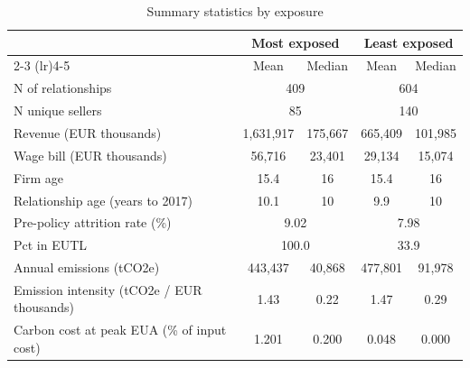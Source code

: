 \begin{table}[ht]
\centering
\caption{Summary statistics by exposure}
\label{tab:phase4_within_nace4d_descriptive_summary_table}
\begin{tabular}{lcccc}
\toprule
 & \multicolumn{2}{c}{Most exposed} & \multicolumn{2}{c}{Least exposed} \\
\cmidrule(lr){2-3} \cmidrule(lr){4-5}
 & Mean & Median & Mean & Median \\
\midrule
N of relationships & \multicolumn{2}{c}{409} & \multicolumn{2}{c}{604} \\
N unique sellers & \multicolumn{2}{c}{85} & \multicolumn{2}{c}{140} \\
\midrule
Revenue (EUR thousands) & 1,631,917 & 175,667 & 665,409 & 101,985 \\
Wage bill (EUR thousands) & 56,716 & 23,401 & 29,134 & 15,074 \\
Firm age & 15.4 & 16 & 15.4 & 16 \\
Relationship age (years to 2017) & 10.1 & 10 & 9.9 & 10 \\
Pre-policy attrition rate (\%) & \multicolumn{2}{c}{9.02} & \multicolumn{2}{c}{7.98} \\
\midrule
Pct in EUTL & \multicolumn{2}{c}{100.0} & \multicolumn{2}{c}{33.9} \\
Annual emissions (tCO2e) & 443,437 & 40,868 & 477,801 & 91,978 \\
Emission intensity (tCO2e / EUR thousands) & 1.43 & 0.22 & 1.47 & 0.29 \\
Carbon cost at peak EUA (\% of input cost) & 1.201 & 0.200 & 0.048 & 0.000 \\
\bottomrule
\end{tabular}
\end{table}
%
